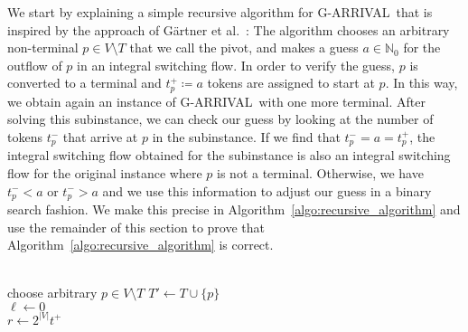 \documentclass[a4paper,UKenglish,cleveref, autoref, thm-restate]{lipics-v2021}
\newcommand{\N}{\mathbb{N}}
\newcommand{\problem}[1]{\textrm{#1}}
\newcommand{\garrival}{\problem{G-ARRIVAL}}
\begin{document}
We start by explaining a simple recursive algorithm for \garrival\ that is inspired by the approach of Gärtner et al.\@~\cite{gartnerSubexponentialAlgorithmARRIVAL2021}: The algorithm chooses an arbitrary non-terminal $p \in V \setminus T$ that we call the pivot, and makes a guess $a \in \N_0$ for the outflow of $p$ in an integral switching flow. In order to verify the guess, $p$ is converted to a terminal and $t^+_p \coloneqq a$ tokens are assigned to start at $p$. In this way, we obtain again an instance of \garrival\ with one more terminal. After solving this subinstance, we can check our guess by looking at the number of tokens $t^-_p$ that arrive at $p$ in the subinstance. If we find that $t^-_p = a = t^+_p$, the integral switching flow obtained for the subinstance is also an integral switching flow for the original instance where $p$ is not a terminal. Otherwise, we have $t^-_p < a$ or $t^-_p > a$ and we use this information to adjust our guess in a binary search fashion. We make this precise in Algorithm~\ref{algo:recursive_algorithm} and use the remainder of this section to prove that Algorithm~\ref{algo:recursive_algorithm} is correct. 

\begin{algorithm}
\DontPrintSemicolon
\caption{}
\label{algo:recursive_algorithm}
\Indm{}\\
\Indp
    choose arbitrary $p \in V \setminus T$  
    $T' \gets T \cup \{p\}$\\
    $\ell \gets 0$\\
    $r \gets 2^{|V|} t^+$\\
\end{algorithm}
\end{document}

